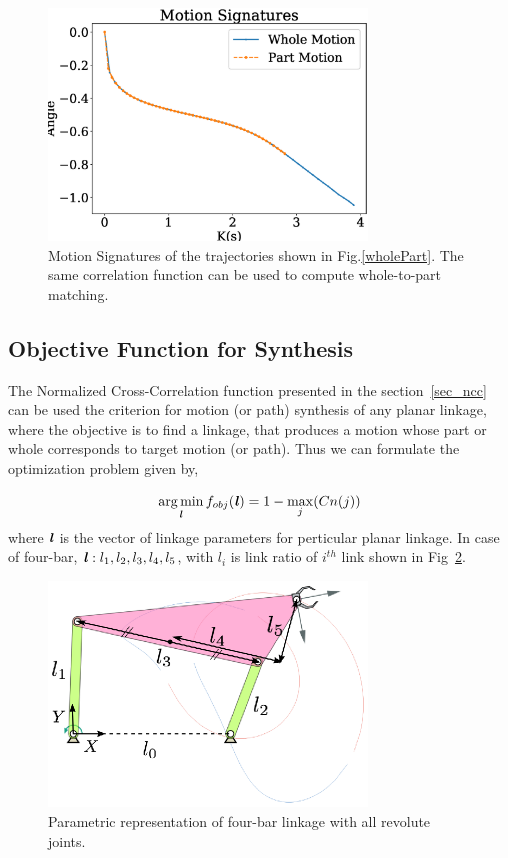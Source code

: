 \documentclass[twocolumn,10pt]{asme2ej}
\DeclareMathOperator*{\argminA}{arg\,min}
\begin{document}
\begin{figure}
\centering
\includegraphics[width=240pt]{figure/fig_motion_signatures.eps}
  \caption{Motion Signatures of the trajectories shown in Fig.\ref{wholePart}. The same correlation function can be used to compute whole-to-part matching.}
\label{motionSignature}
\end{figure}

\subsection{Objective Function for Synthesis}
The Normalized Cross-Correlation function presented in the section~\ref{sec_ncc} can be used the criterion for motion (or path) synthesis of any planar linkage, where the objective is to find a linkage, that produces a motion whose part or whole corresponds to target motion (or path).
Thus we can formulate the optimization problem given by,

\begin{equation}\label{objectiveFun}
  \argminA_{\textbf{\emph{l}}} f_{obj}(\textbf{\emph{l}}) = 1 - \max\limits_{j}(Cn(j))
\end{equation}
where $\textbf{\emph{l}}$ is the vector of linkage parameters for perticular planar linkage.
In case of four-bar, $\textbf{\emph{l}}: l_1, l_2, l_3, l_4, l_5$, with $l_i$ is link ratio of $i^{th}$ link shown in Fig~\ref{fourbar}.

\begin{figure}
\centering
\includegraphics[width=240pt]{figure/fig_fourbar.eps}
  \caption{Parametric representation of four-bar linkage with all revolute joints.}
\label{fourbar}
\end{figure}
\end{document}

